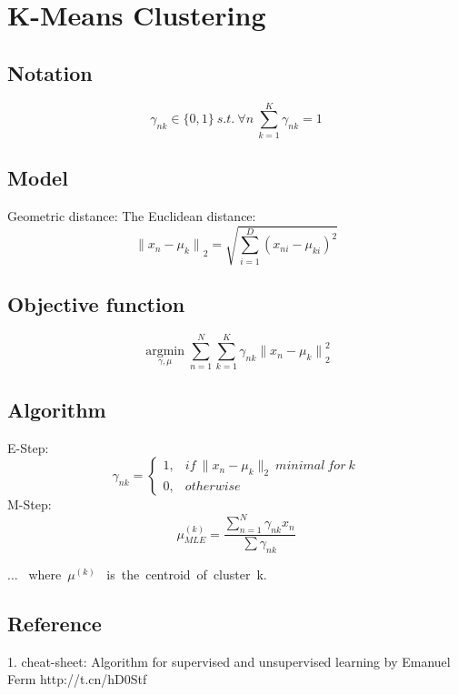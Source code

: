 \chapter{K-Means Clustering}

\section{Notation}

\begin{equation}
\gamma_{nk} \in \{0,1\} \ s.t.\ \forall n\ \sum_{k=1}^K \gamma_{nk}=1
\end{equation}


\section{Model}
Geometric distance: The Euclidean distance:
\begin{equation}
{\|{x_n-\mu_k}\|}_2=\sqrt{\sum_{i=1}^D (x_{ni}-\mu_{ki})^2}
\end{equation}

\section{Objective function}
\begin{equation}
\underset{\gamma,\mu}{\operatorname{argmin}} \sum_{n=1}^N {\sum_{k=1}^K}\gamma_{nk}{{\|{x_n-\mu_k}\|}_2^2}
\end{equation}

\section{Algorithm}
E-Step:
\begin{equation}
\gamma_{nk}=\begin{cases} 1,& if\  \|x_n-\mu_k\|_2 \ minimal\ for  \ k \\ 0, &otherwise \end{cases}
\end{equation}
M-Step:
\begin{equation}
\mu_{MLE}^{(k)}= \frac{\sum_{n=1}^N{\gamma_{nk}x_n}}{\sum \gamma_{nk}}
\end{equation}

$\dotsc$ \ where\ $\mu^{(k)}$ \ is\ the\ centroid\ of\ cluster\ k.

\section{Reference}
1. cheat-sheet: Algorithm for supervised and unsupervised learning by Emanuel Ferm http://t.cn/hD0Stf
